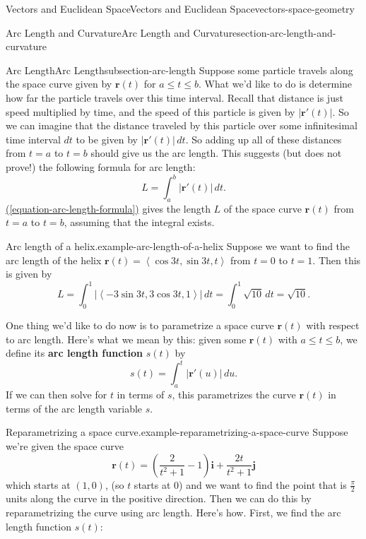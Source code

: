 \documentclass[oneside,10pt,]{book}
\newcommand{\terminology}[1]{\textbf{#1}}
\numberwithin{equation}{section}
\newcommand{\vv}[1]{\mathbf{#1}}
\newcommand{\dotprod}[1]{\left\langle #1 \right\rangle}
\begin{document}
\begin{chapterptx}{Vectors and Euclidean Space}{}{Vectors and Euclidean Space}{}{}{vectors-space-geometry}
\begin{sectionptx}{Arc Length and Curvature}{}{Arc Length and Curvature}{}{}{section-arc-length-and-curvature}
\begin{subsectionptx}{Arc Length}{}{Arc Length}{}{}{subsection-arc-length}
Suppose some particle travels along the space curve given by \(\vv{r}(t)\) for \(a\leq t\leq b\). What we'd like to do is determine how far the particle travels over this time interval. Recall that distance is just speed multiplied by time, and the speed of this particle is given by \(|\vv{r}'(t)|\). So we can imagine that the distance traveled by this particle over some infinitesimal time interval \(dt\) to be given by \(|\vv{r}'(t)|\,dt\). So adding up all of these distances from \(t=a\) to \(t=b\) should give us the arc length. This suggests (but does not prove!) the following formula for arc length:%
%
\begin{equation}
L = \int_{a}^{b}|\vv{r}'(t)|\,dt.\label{equation-arc-length-formula}
\end{equation}
\hypertarget{p-1277}{}%
\hyperref[equation-arc-length-formula]{(\ref{equation-arc-length-formula})} gives the length \(L\) of the space curve \(\vv{r}(t)\) from \(t=a\) to \(t=b\), assuming that the integral exists.%
\begin{example}{Arc length of a helix.}{example-arc-length-of-a-helix}%
\hypertarget{p-1278}{}%
Suppose we want to find the arc length of the helix \(\vv{r}(t) = \dotprod{\cos 3t,\sin 3t, t}\) from \(t=0\) to \(t=1\). Then this is given by%
%
\begin{equation*}
L = \int_{0}^{1}|\dotprod{-3\sin3t, 3\cos3t, 1}|\,dt = \int_{0}^{1}\sqrt{10}\,dt = \sqrt{10}.
\end{equation*}
\end{example}
\hypertarget{p-1279}{}%
One thing we'd like to do now is to parametrize a space curve \(\vv{r}(t)\) with respect to arc length. Here's what we mean by this: given some \(\vv{r}(t)\) with \(a\leq t\leq b\), we define its \terminology{arc length function} \(s(t)\) by%
%
\begin{equation*}
s(t) = \int_{a}^{t}|\vv{r}'(u)|\,du.
\end{equation*}
\hypertarget{p-1280}{}%
If we can then solve for \(t\) in terms of \(s\), this parametrizes the curve \(\vv{r}(t)\) in terms of the arc length variable \(s\).%
\begin{example}{Reparametrizing a space curve.}{example-reparametrizing-a-space-curve}%
\hypertarget{p-1281}{}%
Suppose we're given the space curve%
%
\begin{equation*}
\vv{r}(t) = \left(\frac{2}{t^{2}+1}-1\right)\vv{i}+\frac{2t}{t^{2}+1}\vv{j}
\end{equation*}
\hypertarget{p-1282}{}%
which starts at \((1,0)\), (so \(t\) starts at \(0\)) and we want to find the point that is \(\frac{\pi}{2}\) units along the curve in the positive direction. Then we can do this by reparametrizing the curve using arc length. Here's how. First, we find the arc length function \(s(t)\):%

\end{example}
\end{subsectionptx}
\end{sectionptx}
\end{chapterptx}
\end{document}
